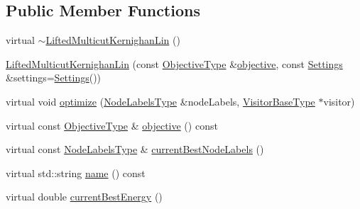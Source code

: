 \subsection*{Public Member Functions}
\begin{DoxyCompactItemize}
\item 
virtual \hyperlink{classnifty_1_1graph_1_1lifted__multicut_1_1LiftedMulticutKernighanLin_a4509f25ff55cc263502fd232ea8ba6da}{$\sim$\+Lifted\+Multicut\+Kernighan\+Lin} ()
\item 
\hyperlink{classnifty_1_1graph_1_1lifted__multicut_1_1LiftedMulticutKernighanLin_a9d04f08cb07457ce5afe8d7d894d51b6}{Lifted\+Multicut\+Kernighan\+Lin} (const \hyperlink{classnifty_1_1graph_1_1lifted__multicut_1_1LiftedMulticutKernighanLin_a7272520833b07efc1aa511a9733d3771}{Objective\+Type} \&\hyperlink{classnifty_1_1graph_1_1lifted__multicut_1_1LiftedMulticutKernighanLin_ad5a0821bb2d713d6a0da1e32b92c11b7}{objective}, const \hyperlink{structnifty_1_1graph_1_1lifted__multicut_1_1LiftedMulticutKernighanLin_1_1Settings}{Settings} \&settings=\hyperlink{structnifty_1_1graph_1_1lifted__multicut_1_1LiftedMulticutKernighanLin_1_1Settings}{Settings}())
\item 
virtual void \hyperlink{classnifty_1_1graph_1_1lifted__multicut_1_1LiftedMulticutKernighanLin_a7ac78466ea75988d7f5058605937ef7e}{optimize} (\hyperlink{classnifty_1_1graph_1_1lifted__multicut_1_1LiftedMulticutKernighanLin_a454b79099051fd0044c227002191e7f6}{Node\+Labels\+Type} \&node\+Labels, \hyperlink{classnifty_1_1graph_1_1lifted__multicut_1_1LiftedMulticutKernighanLin_a857f9aef39b602be2db6657bf159b238}{Visitor\+Base\+Type} $\ast$visitor)
\item 
virtual const \hyperlink{classnifty_1_1graph_1_1lifted__multicut_1_1LiftedMulticutKernighanLin_a7272520833b07efc1aa511a9733d3771}{Objective\+Type} \& \hyperlink{classnifty_1_1graph_1_1lifted__multicut_1_1LiftedMulticutKernighanLin_ad5a0821bb2d713d6a0da1e32b92c11b7}{objective} () const 
\item 
virtual const \hyperlink{classnifty_1_1graph_1_1lifted__multicut_1_1LiftedMulticutKernighanLin_a454b79099051fd0044c227002191e7f6}{Node\+Labels\+Type} \& \hyperlink{classnifty_1_1graph_1_1lifted__multicut_1_1LiftedMulticutKernighanLin_ad8a89088f52b1c107fa125f91b9476fb}{current\+Best\+Node\+Labels} ()
\item 
virtual std\+::string \hyperlink{classnifty_1_1graph_1_1lifted__multicut_1_1LiftedMulticutKernighanLin_ae20a347def094ed6336918b5ac599b83}{name} () const 
\item 
virtual double \hyperlink{classnifty_1_1graph_1_1lifted__multicut_1_1LiftedMulticutKernighanLin_a90be82d453dd0007fd7d6426f0914407}{current\+Best\+Energy} ()
\end{DoxyCompactItemize}


